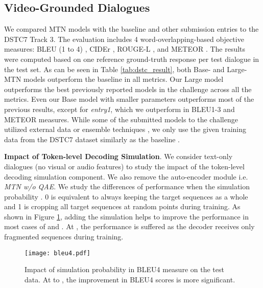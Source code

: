 \documentclass[11pt,a4paper]{article}
\begin{document}
\subsection{Video-Grounded Dialogues}
We compared MTN models with the baseline \cite{hori2018end} and other submission entries to the DSTC7 Track 3. The evaluation includes 4 word-overlapping-based objective measures: BLEU (1 to 4) \cite{papineni2002bleu}, CIDEr \cite{vedantam2015cider}, ROUGE-L \cite{lin2004rouge}, and METEOR \cite{banerjee2005meteor}. The results were computed based on one reference ground-truth response per test dialogue in the test set. 
As can be seen in Table \ref{tab:dstc_result}, both Base- and Large-MTN models outperform the baseline \cite{hori2018end} in all metrics.
Our Large model outperforms the best previously reported models in the challenge across all the metrics. Even our Base model with smaller parameters outperforms most of the previous results, except for \textit{entry1}, which we outperform in BLEU1-3 and METEOR measures. While some of the submitted models to the challenge utilized external data or ensemble techniques \cite{alamri2018audio}, we only use the given training data from the DSTC7 dataset similarly as the baseline \cite{hori2018end}. 

\noindent\textbf{Impact of Token-level Decoding Simulation}. We consider text-only dialogues (no visual or audio features) to study the impact of the token-level decoding simulation component. We also remove the auto-encoder module i.e. \textit{MTN w/o QAE}. We study the differences of performance when the simulation probability . 0 is equivalent to always keeping the target sequences as a whole and 1 is cropping all target sequences at random points during training. As shown in Figure \ref{fig:sim_prob}, adding the simulation helps to improve the performance in most cases of  and . 
At , the performance is suffered as the decoder receives only fragmented sequences during training. 


\begin{figure}[htbp]
	\centering
	\texttt{[image: bleu4.pdf]}
	\caption{Impact of simulation probability  in BLEU4 measure on the test data. At  to , the improvement in BLEU4 scores is more significant.}
	\label{fig:sim_prob}
\end{figure}
\end{document}
